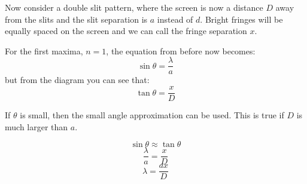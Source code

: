 \documentclass[revision-guide.tex]{subfiles}
\begin{document}
Now consider a double slit pattern, where the screen is now a distance $D$ away from the slits and the slit separation is $a$ instead of $d$. Bright fringes will be equally spaced on the screen and we can call the fringe separation $x$.



For the first maxima, $n=1$, the equation from before now becomes:
$$\sin\theta = \frac{\lambda}{a}$$
but from the diagram you can see that:
$$\tan\theta = \frac{x}{D}$$

If $\theta$ is small, then the small angle approximation can be used. This is true if $D$ is much larger than $a$.

$$\sin\theta \approx \tan\theta$$
$$\frac{\lambda}{a} = \frac{x}{D}$$
$$\lambda = \frac{ax}{D}$$
\end{document}
